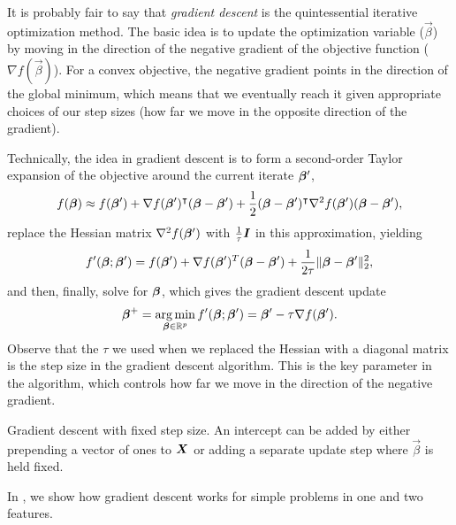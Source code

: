 It is probably fair to say that \emph{gradient descent} is the quintessential iterative optimization method. The basic idea is to update the optimization variable (\(\vec{\beta}\)) by moving in the direction of the negative gradient of the objective function (\(\nabla f (\vec{\beta})\)). For a convex objective, the negative gradient points in the direction of the global minimum, which means that we eventually reach it given appropriate choices of our step sizes (how far we move in the opposite direction of the gradient).

Technically, the idea in gradient descent is to form a second-order Taylor expansion of the objective around the current iterate \(\boldsymbol{\beta}'\),
\begin{equation*}
  f(\boldsymbol{\beta}) \approx f(\boldsymbol{\beta}') + \nabla f(\boldsymbol{\beta}')^\intercal (\boldsymbol{\beta} - \boldsymbol{\beta}') + \frac{1}{2}(\boldsymbol{\beta} - \boldsymbol{\beta}')^\intercal \nabla^2 f(\boldsymbol{\beta}')(\boldsymbol{\beta} - \boldsymbol{\beta}'),
\end{equation*}
replace the Hessian matrix \(\nabla^2 f(\boldsymbol{\beta}')\) with \(\frac {1}{\tau} \boldsymbol{I}\) in this approximation, yielding
\begin{equation*}
  f'(\boldsymbol{\beta}; \boldsymbol{\beta}') = f(\boldsymbol{\beta}') + \nabla f(\boldsymbol{\beta}')^T(\boldsymbol{\beta} - \boldsymbol{\beta}') + \frac{1}{2\tau}\lVert \boldsymbol{\beta} - \boldsymbol{\beta}'\rVert_2^2,
\end{equation*}
and then, finally, solve for \(\boldsymbol{\beta}\), which gives the gradient descent update
\[
  \boldsymbol{\beta}^+ =\operatorname*{arg\,min}_{\boldsymbol{\beta} \in \mathbb{R}^p} f'(\boldsymbol{\beta}; \boldsymbol{\beta}') = \boldsymbol{\beta}' - \tau \nabla f(\boldsymbol{\beta}').
\]
Observe that the \(\tau\) we used when we replaced the Hessian with a diagonal matrix is the step size in the gradient descent algorithm. This is the key parameter in the algorithm, which controls how far we move in the direction of the negative gradient.

\begin{algorithm}
  \caption{Gradient descent with fixed step size. An intercept can be added by either prepending a vector of ones to \(\boldsymbol{X}\) or adding a separate update step where \(\vec{\beta}\) is held fixed.}
  \label{alg:gradient-descent}

\end{algorithm}

In , we show how gradient descent works for simple problems in one and two features.

